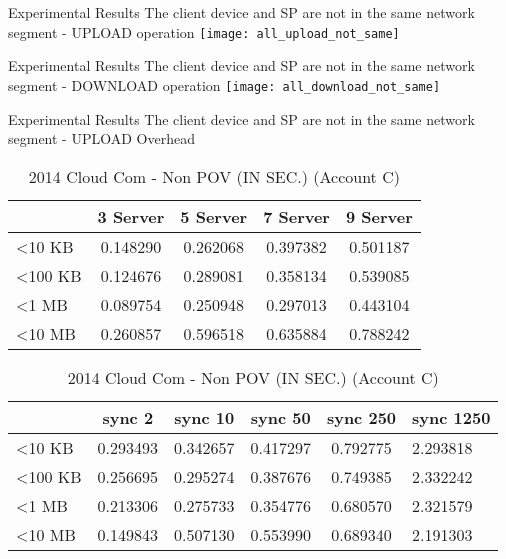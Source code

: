 \begin{frame}{Experimental Results}
{The client device and SP are \alert{not} in the same network segment - UPLOAD operation}
	\texttt{[image: all\_upload\_not\_same]}
\end{frame}

\begin{frame}{Experimental Results}
{The client device and SP are \alert{not} in the same network segment - DOWNLOAD operation}
	\texttt{[image: all\_download\_not\_same]}
\end{frame}

\begin{frame}{Experimental Results}
{The client device and SP are \alert{not} in the same network segment - UPLOAD Overhead}
	\scriptsize
    \begin{table}[]
    \centering
    \caption{My Method - Non POV (IN SEC.) (Account C)}
    \begin{tabular}{lcccc}
                         & 3 Server & 5 Server & 7 Server & 9 Server \\ \hline
        \textless 10 KB  & 0.148290 & 0.262068 & 0.397382 & 0.501187 \\ \hline
        \textless 100 KB & 0.124676 & 0.289081 & 0.358134 & 0.539085 \\ \hline
        \textless 1 MB   & 0.089754 & 0.250948 & 0.297013 & 0.443104 \\ \hline
        \textless 10 MB  & 0.260857 & 0.596518 & 0.635884 & 0.788242 \\ \hline
    \end{tabular}
    \caption{2014 Cloud Com - Non POV (IN SEC.) (Account C)}
    \begin{tabular}{lccccl}
                         & sync 2   & sync 10  & sync 50  & sync 250 & sync 1250 \\ \hline
        \textless 10 KB  & 0.293493 & 0.342657 & 0.417297 & 0.792775 & 2.293818  \\ \hline
        \textless 100 KB & 0.256695 & 0.295274 & 0.387676 & 0.749385 & 2.332242  \\ \hline
        \textless 1 MB   & 0.213306 & 0.275733 & 0.354776 & 0.680570 & 2.321579  \\ \hline
        \textless 10 MB  & 0.149843 & 0.507130 & 0.553990 & 0.689340 & 2.191303  \\ \hline
    \end{tabular}
    \end{table}
\end{frame}


